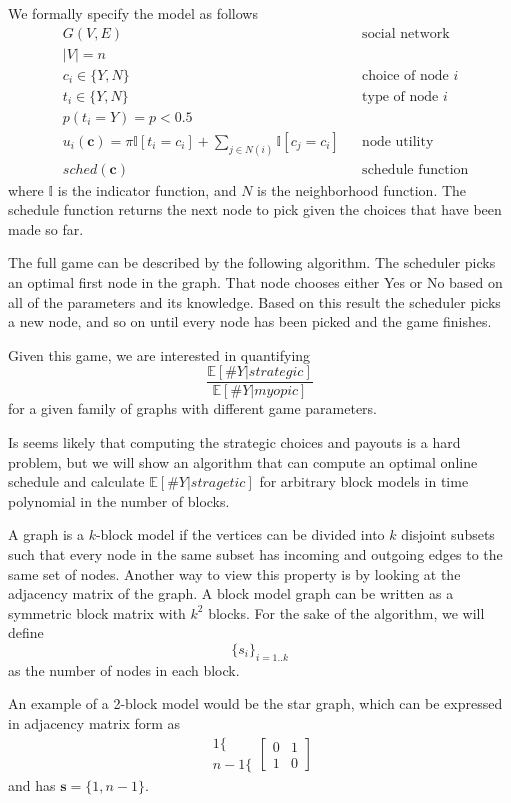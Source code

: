 \documentclass{article}
\begin{document}
We formally specify the model as follows
\begin{align*}
  & G(V,E) && \text{social network} \\
  & |V| = n \\
  & c_i \in \{Y,N\} && \text{choice of node $i$} \\
  & t_i \in \{Y, N\} && \text{type of node $i$} \\
  & p(t_i = Y) = p < 0.5 \\
  & u_i(\mathbf c) = \pi \mathbb I[t_i = c_i] + \sum_{j \in N(i)}
  \mathbb I[c_j = c_i] && \text{node utility} \\
  & sched(\mathbf c) && \text{schedule function}
\end{align*}
where $\mathbb I$ is the indicator function, and $N$ is the neighborhood
function. The schedule function returns the next node to pick given
the choices that have been made so far.

The full game can be described by the following algorithm. The
scheduler picks an optimal first node in the graph. That node chooses
either Yes or No based on all of the parameters and its
knowledge. Based on this result the scheduler picks a new node, and so
on until every node has been picked and the game finishes.

Given this game, we are interested in quantifying
\begin{equation*}
  \frac{\mathbb E[\#Y|strategic]}{\mathbb E[\#Y|myopic]}
\end{equation*}
for a given family of graphs with different game parameters.

Is seems likely that computing the strategic choices and payouts is a
hard problem, but we will show an algorithm that can compute an
optimal online schedule and calculate $\mathbb E[\#Y|stragetic]$ for arbitrary
block models in time polynomial in the number of blocks.

A graph is a $k$-block model if the vertices can be divided into $k$
disjoint subsets such that every node in the same subset has
incoming and outgoing edges to the same set of nodes. Another way to
view this property is by looking at the adjacency matrix of the
graph. A block model graph can be written as a symmetric block matrix
with $k^2$ blocks. For the sake of the algorithm, we will define
\begin{equation*}
  \{s_i\}_{i=1..k}
\end{equation*}
as the number of nodes in each block.

An example of a 2-block model would be the star graph, which can be
expressed in adjacency matrix form as
\begin{equation*}
  \begin{array}{r}
    1 \{ \\
    n-1 \{
  \end{array}
  \left[ \begin{array}{cc}
      0 & 1 \\
      1 & 0
      \end{array} \right]
\end{equation*}
and has $\mathbf s = \{1, n-1\}$.
\end{document}
